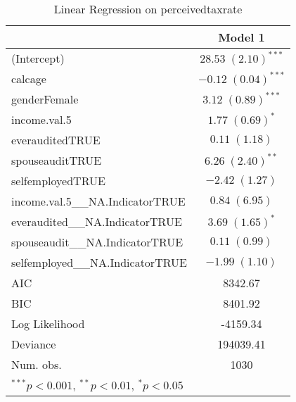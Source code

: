 
\begin{table}
\begin{tabular}{l c }
\hline
 & Model 1 \\
\hline
(Intercept)                      & $28.53 \; (2.10)^{***}$ \\
calcage                          & $-0.12 \; (0.04)^{***}$ \\
genderFemale                     & $3.12 \; (0.89)^{***}$  \\
income.val.5                     & $1.77 \; (0.69)^{*}$    \\
everauditedTRUE                  & $0.11 \; (1.18)$        \\
spouseauditTRUE                  & $6.26 \; (2.40)^{**}$   \\
selfemployedTRUE                 & $-2.42 \; (1.27)$       \\
income.val.5\_\_NA.IndicatorTRUE & $0.84 \; (6.95)$        \\
everaudited\_\_NA.IndicatorTRUE  & $3.69 \; (1.65)^{*}$    \\
spouseaudit\_\_NA.IndicatorTRUE  & $0.11 \; (0.99)$        \\
selfemployed\_\_NA.IndicatorTRUE & $-1.99 \; (1.10)$       \\
\hline
AIC                              & 8342.67                 \\
BIC                              & 8401.92                 \\
Log Likelihood                   & -4159.34                \\
Deviance                         & 194039.41               \\
Num. obs.                        & 1030                    \\
\hline
\multicolumn{2}{l}{\scriptsize{$^{***}p<0.001$, $^{**}p<0.01$, $^*p<0.05$}}
\end{tabular}
\caption{Linear Regression on perceivedtaxrate}
\label{table:coefficients}
\end{table}
